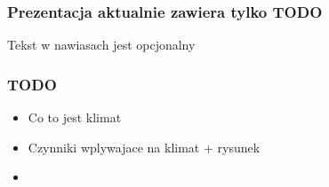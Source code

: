 \documentclass{beamer}
\begin{document}
	\begin{frame}
		\frametitle{Prezentacja aktualnie zawiera tylko TODO}
		Tekst w nawiasach jest opcjonalny
	\end{frame}
	

	\begin{frame}
		\frametitle{TODO}
		\begin{itemize}[<+->]
			\item Co to jest klimat
			\item Czynniki wplywajace na klimat + rysunek
			\item 

		\end{itemize}
	\end{frame}
\end{document}
